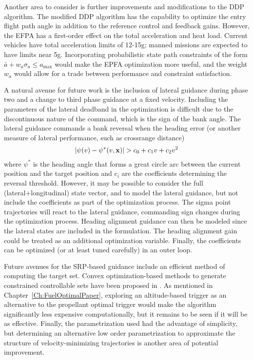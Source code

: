Another area to consider is further improvements and modifications to the DDP algorithm. The modified DDP algorithm has the capability to optimize the entry flight path angle in addition to the reference control and feedback gains. However, the EFPA has a first-order effect on the total acceleration and heat load. Current vehicles have total acceleration limits of 12-15g; manned missions are expected to have limits near 5g. Incorporating probabilistic state path constraints of the form $\bar{a} + w_a\sigma_a \le a_{\max}$ would make the EPFA optimization more useful, and the weight $w_a$ would allow for a trade between performance and constraint satisfaction. 

A natural avenue for future work is the inclusion of lateral guidance during phase two and a change to third phase guidance at a fixed velocity. Including the parameters of the lateral deadband in the optimization is difficult due to the discontinuous nature of the command, which is the sign of the bank angle. The lateral guidance commands a bank reversal when the heading error (or another measure of lateral performance, such as crossrange distance) 
\begin{align}
|\psi(v)-\psi^*(v,\mathbf{x})| > c_0 + c_1v+c_2v^2
\end{align}
where $ \psi^* $ is the heading angle that forms a great circle arc between the current position and the target position and $c_i$ are the coefficients determining the reversal threshold. 
However, it may be possible to consider the full (lateral+longitudinal) state vector, and to model the lateral guidance, but not include the coefficients as part of the optimization process. The sigma point trajectories will react to the lateral guidance, commanding sign changes during the optimization process. Heading alignment guidance can then be modeled since the lateral states are included in the formulation. The heading alignment gain could be treated as an additional optimization variable. Finally, the coefficients can be optimized (or at least tuned carefully) in an outer loop.  

Future avenues for the SRP-based guidance include an efficient method of computing the target set. Convex optimization-based methods to generate constrained controllable sets have been proposed in \cite{SRP_ControllableSets}. As mentioned in Chapter~\ref{Ch:FuelOptimalPaper}, exploring an altitude-based trigger as an alternative to the propellant optimal trigger would make the algorithm significantly less expensive computationally, but it remains to be seen if it will be as effective. Finally, the parametrization used had the advantage of simplicity, but determining an alternative low order parametrization to approximate the structure of velocity-minimizing trajectories is another area of potential improvement. 
 
